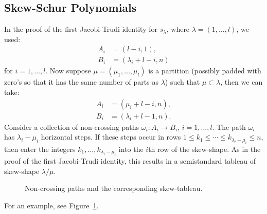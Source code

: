 \documentclass[11pt]{amsproc}
\theoremstyle{definition}
\theoremstyle{example}
\begin{document}
\subsection{Skew-Schur Polynomials}
\label{sec:skew-schur-functions}
In the proof of the first Jacobi-Trudi identity for $s_\lambda$, where $\lambda=(1,\dotsc, l)$, we used:
\begin{align*}
  A_i & = (l-i, 1),\\
  B_i & = (\lambda_i+l-i, n)
\end{align*}
for $i=1,\dotsc, l$.
Now suppose $\mu = (\mu_1,\dotsc, \mu_l)$ is a partition (possibly padded with zero's so that it has the same number of parts as $\lambda$) such that $\mu\subset \lambda$, then we can take:
\begin{align*}
  A_i & = (\mu_i+l-i, n),\\
  B_i & = (\lambda_i+l-1, n).
\end{align*}
Consider a collection of non-crossing paths $\omega_i:A_i\to B_i$, $i=1,\dotsc,l$.
The path $\omega_i$ has $\lambda_i-\mu_i$ horizontal steps.
If these steps occur in rows $1\leq k_1\leq \dotsb \leq k_{\lambda_i-\mu_i}\leq n$, then enter the integers $k_1,\dotsc,k_{\lambda_i-\mu_i}$ into the $i$th row of the skew-shape.
As in the proof of the first Jacobi-Trudi identity, this results in a semistandard tableau of skew-shape $\lambda/\mu$.
\begin{figure}[h]
  \centering 
    \hspace{1cm}  
  \caption{Non-crossing paths and the corresponding skew-tableau.}
  \label{fig:skew-jth}
\end{figure}
For an example, see Figure~\ref{fig:skew-jth}.
\end{document}
